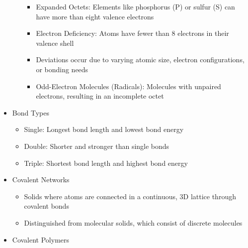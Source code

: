 \begin{itemize}
\begin{itemize}
        \begin{itemize}

          \item Expanded Octets: Elements like phosphorus (P) or sulfur (S) can have more than eight valence electrons

          \item Electron Deficiency: Atoms have fewer than 8 electrons in their valence shell

          \item Deviations occur due to varying atomic size, electron configurations, or bonding needs

          \item Odd-Electron Molecules (Radicals): Molecules with unpaired electrons, resulting in an incomplete octet

        \end{itemize}

    \end{itemize}

  \item Bond Types

    \begin{itemize}

      \item Single: Longest bond length and lowest bond energy

      \item Double: Shorter and stronger than single bonds

      \item Triple: Shortest bond length and highest bond energy

    \end{itemize}

  \item Covalent Networks

    \begin{itemize}

      \item Solids where atoms are connected in a continuous, 3D lattice through covalent bonds

      \item Distinguished from molecular solids, which consist of discrete molecules

    \end{itemize}
    
  \item Covalent Polymers

    \begin{itemize}


\end{itemize}
\end{itemize}
